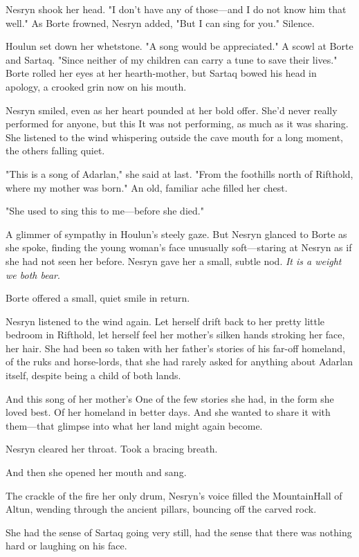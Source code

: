 Nesryn shook her head. "I don't have any of those---and I do not know him that well." As Borte frowned, Nesryn added, "But I can sing for you." Silence.

Houlun set down her whetstone. "A song would be appreciated." A scowl at Borte and Sartaq. "Since neither of my children can carry a tune to save their lives." Borte rolled her eyes at her hearth-mother, but Sartaq bowed his head in apology, a crooked grin now on his mouth.

Nesryn smiled, even as her heart pounded at her bold offer. She'd never really performed for anyone, but this  It was not performing, as much as it was sharing. She listened to the wind whispering outside the cave mouth for a long moment, the others falling quiet.

"This is a song of Adarlan," she said at last. "From the foothills north of Rifthold, where my mother was born." An old, familiar ache filled her chest.

"She used to sing this to me---before she died."

A glimmer of sympathy in Houlun's steely gaze. But Nesryn glanced to Borte as she spoke, finding the young woman's face unusually soft---staring at Nesryn as if she had not seen her before. Nesryn gave her a small, subtle nod. \emph{It is a weight we both bear}.

Borte offered a small, quiet smile in return.

Nesryn listened to the wind again. Let herself drift back to her pretty little bedroom in Rifthold, let herself feel her mother's silken hands stroking her face, her hair. She had been so taken with her father's stories of his far-off homeland, of the ruks and horse-lords, that she had rarely asked for anything about Adarlan itself, despite being a child of both lands.

And this song of her mother's  One of the few stories she had, in the form she loved best. Of her homeland in better days. And she wanted to share it with them---that glimpse into what her land might again become.

Nesryn cleared her throat. Took a bracing breath.

And then she opened her mouth and sang.

The crackle of the fire her only drum, Nesryn's voice filled the MountainHall of Altun, wending through the ancient pillars, bouncing off the carved rock.

She had the sense of Sartaq going very still, had the sense that there was nothing hard or laughing on his face.

